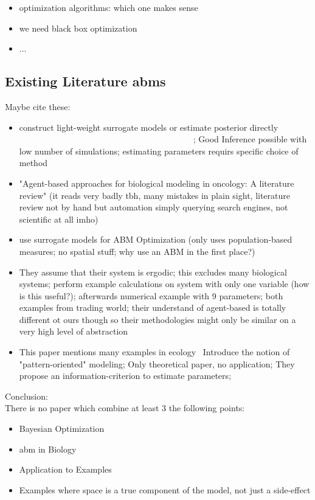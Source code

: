 \documentclass{article}
\newcommand{\todo}[1]{\colorbox{WildStrawberry}{\textcolor{white}{#1}}}
\begin{document}
\begin{itemize}
    \item optimization algorithms: which one makes sense
    \item we need black box optimization
    \item ...
\end{itemize}

\subsection*{Existing Literature \acp{abm}}

Maybe cite these:
\cite{Lima2021,Duswald2024}

\begin{itemize}
    \item \cite{Jrgensen2022} construct light-weight surrogate models or estimate posterior directly
        \todo{can these surrogate models always be constructed?}; Good Inference possible with low
        number of simulations; estimating parameters requirs specific choice of method
    \item \cite{Stephan2024} "Agent-based approaches for biological modeling in oncology: A
        literature review" (it reads very badly tbh, many mistakes in plain sight, literature review
        not by hand but automation simply querying search engines, not scientific at all imho)
    \item \cite{An2016} use surrogate models for ABM Optimization (only uses population-based
        measures; no spatial stuff; why use an ABM in the first place?)
    \item \cite{Grazzini2017} They assume that their system is ergodic; this excludes many
        biological systems; perform example calculations on system with only one variable (how is
        this useful?); afterwards numerical example with 9 parameters; both examples from trading
        world; their understand of agent-based is totally different ot ours though so their
        methodologies might only be similar on a very high level of abstraction
    \item This paper mentions many examples in ecology~\cite{Piou2009}
        Introduce the notion of "pattern-oriented" modeling; Only theoretical paper, no application;
        They propose an information-criterion to estimate parameters;
\end{itemize}

Conclusion:\\
There is no paper which combine at least 3 the following points:
\begin{itemize}
    \item Bayesian Optimization
    \item \ac{abm} in Biology
    \item Application to Examples
    \item Examples where space is a true component of the model, not just a side-effect
\end{itemize}
\end{document}
